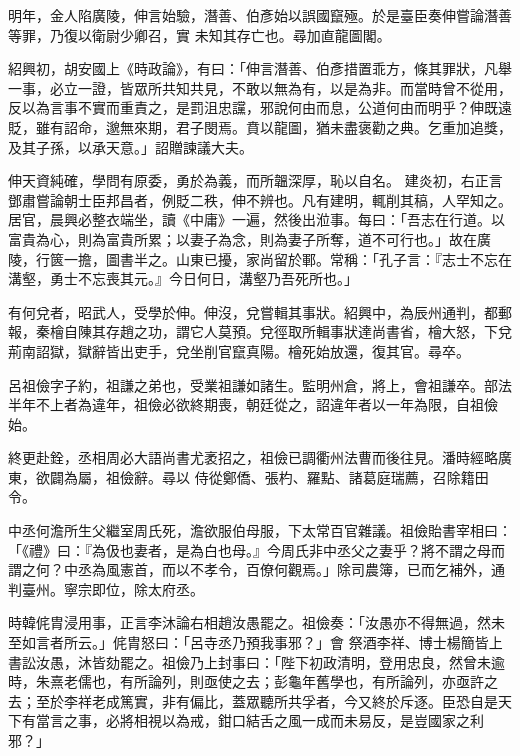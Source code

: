 \begin{pinyinscope}
 明年，金人陷廣陵，伸言始驗，潛善、伯彥始以誤國竄殛。於是臺臣奏伸嘗論潛善等罪，乃復以衛尉少卿召，實
 未知其存亡也。尋加直龍圖閣。



 紹興初，胡安國上《時政論》，有曰：「伸言潛善、伯彥措置乖方，條其罪狀，凡舉一事，必立一證，皆眾所共知共見，不敢以無為有，以是為非。而當時曾不從用，反以為言事不實而重責之，是罰沮忠讜，邪說何由而息，公道何由而明乎？伸既遠貶，雖有詔命，邈無來期，君子閔焉。賁以龍圖，猶未盡褒勸之典。乞重加追獎，及其子孫，以承天意。」詔贈諫議大夫。



 伸天資純確，學問有原委，勇於為義，而所韞深厚，恥以自名。
 建炎初，右正言鄧肅嘗論朝士臣邦昌者，例貶二秩，伸不辨也。凡有建明，輒削其稿，人罕知之。居官，晨興必整衣端坐，讀《中庸》一遍，然後出涖事。每曰：「吾志在行道。以富貴為心，則為富貴所累；以妻子為念，則為妻子所奪，道不可行也。」故在廣陵，行篋一擔，圖書半之。山東已擾，家尚留於鄆。常稱：「孔子言：『志士不忘在溝壑，勇士不忘喪其元。』今日何日，溝壑乃吾死所也。」



 有何兌者，昭武人，受學於伸。伸沒，兌嘗輯其事狀。紹興中，為辰州通判，都郵
 報，秦檜自陳其存趙之功，謂它人莫預。兌徑取所輯事狀達尚書省，檜大怒，下兌荊南詔獄，獄辭皆出吏手，兌坐削官竄真陽。檜死始放還，復其官。尋卒。



 呂祖儉字子約，祖謙之弟也，受業祖謙如諸生。監明州倉，將上，會祖謙卒。部法半年不上者為違年，祖儉必欲終期喪，朝廷從之，詔違年者以一年為限，自祖儉始。



 終更赴銓，丞相周必大語尚書尤袤招之，祖儉已調衢州法曹而後往見。潘時經略廣東，欲闢為屬，祖儉辭。尋以
 侍從鄭僑、張杓、羅點、諸葛庭瑞薦，召除籍田令。



 中丞何澹所生父繼室周氏死，澹欲服伯母服，下太常百官雜議。祖儉貽書宰相曰：「《禮》曰：『為伋也妻者，是為白也母。』今周氏非中丞父之妻乎？將不謂之母而謂之何？中丞為風憲首，而以不孝令，百僚何觀焉。」除司農簿，已而乞補外，通判臺州。寧宗即位，除太府丞。



 時韓侂胄浸用事，正言李沐論右相趙汝愚罷之。祖儉奏：「汝愚亦不得無過，然未至如言者所云。」侂胄怒曰：「呂寺丞乃預我事邪？」會
 祭酒李祥、博士楊簡皆上書訟汝愚，沐皆劾罷之。祖儉乃上封事曰：「陛下初政清明，登用忠良，然曾未逾時，朱熹老儒也，有所論列，則亟使之去；彭龜年舊學也，有所論列，亦亟許之去；至於李祥老成篤實，非有偏比，蓋眾聽所共孚者，今又終於斥逐。臣恐自是天下有當言之事，必將相視以為戒，鉗口結舌之風一成而未易反，是豈國家之利邪？」




\end{pinyinscope}
